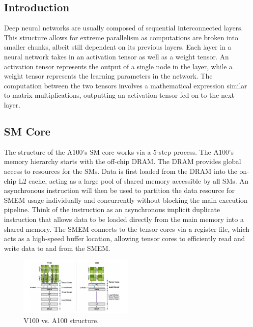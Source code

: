 \subsection{Introduction}
\label{subsec:introduction}
Deep neural networks are usually composed of sequential interconnected layers.
This structure allows for extreme parallelism as computations are broken into smaller chunks, albeit still dependent on its previous layers.
Each layer in a neural network takes in an activation tensor as well as a weight tensor.
An activation tensor represents the output of a single node in the layer, while a weight tensor represents the learning parameters in the network.
The computation between the two tensors involves a mathematical expression similar to matrix multiplications, outputting an activation tensor fed on to the next layer.

\subsection{SM Core}
\label{subsec:sm-core}
The structure of the A100's SM core works via a 5-step process.
The A100's memory hierarchy starts with the off-chip DRAM\@.
The DRAM provides global access to resources for the SMs.
Data is first loaded from the DRAM into the on-chip L2 cache, acting as a large pool of shared memory accessible by all SMs.
An asynchronous instruction will then be used to partition the data resource for SMEM usage individually and concurrently without blocking the main execution pipeline.
Think of the instruction as an asynchronous implicit duplicate instruction that allows data to be loaded directly from the main memory into a shared memory.
The SMEM connects to the tensor cores via a register file, which acts as a high-speed buffer location, allowing tensor cores to efficiently read and write data to and from the SMEM\@.

\begin{figure}[htbp!]
    \centerline{\includegraphics[width=0.5\textwidth]{images/gpu_structure}}
    \caption{V100 vs. A100 structure.}
    \label{fig:v100a100struct}
\end{figure}

